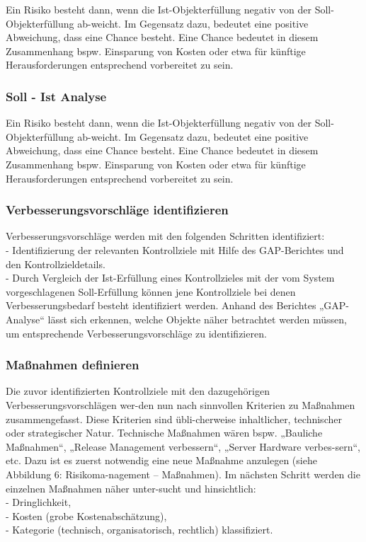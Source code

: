 Ein Risiko besteht dann, wenn die Ist-Objekterfüllung negativ von der Soll-Objekterfüllung ab-weicht. Im Gegensatz dazu, bedeutet eine positive Abweichung, dass eine Chance besteht. Eine Chance bedeutet in diesem Zusammenhang bspw. Einsparung von Kosten oder etwa für künftige Herausforderungen entsprechend vorbereitet zu sein.
\subsubsection{Soll - Ist Analyse}
Ein Risiko besteht dann, wenn die Ist-Objekterfüllung negativ von der Soll-Objekterfüllung ab-weicht. Im Gegensatz dazu, bedeutet eine positive Abweichung, dass eine Chance besteht. Eine Chance bedeutet in diesem Zusammenhang bspw. Einsparung von Kosten oder etwa für künftige Herausforderungen entsprechend vorbereitet zu sein.

\subsubsection{Verbesserungsvorschläge identifizieren}
Verbesserungsvorschläge werden mit den folgenden Schritten identifiziert:\\
- Identifizierung der relevanten Kontrollziele mit Hilfe des GAP-Berichtes und den Kontrollzieldetails.
\\- Durch Vergleich der Ist-Erfüllung eines Kontrollzieles mit der vom System vorgeschlagenen Soll-Erfüllung können jene Kontrollziele bei denen Verbesserungsbedarf besteht identifiziert werden.
Anhand des Berichtes „GAP-Analyse“ lässt sich erkennen, welche Objekte näher betrachtet werden müssen, um entsprechende Verbesserungsvorschläge zu identifizieren.
\subsubsection{Maßnahmen definieren}
Die zuvor identifizierten Kontrollziele mit den dazugehörigen Verbesserungsvorschlägen wer-den nun nach sinnvollen Kriterien zu Maßnahmen zusammengefasst. Diese Kriterien sind übli-cherweise inhaltlicher, technischer oder strategischer Natur. Technische Maßnahmen wären bspw. „Bauliche Maßnahmen“, „Release Management verbessern“, „Server Hardware verbes-sern“, etc.
Dazu ist es zuerst notwendig eine neue Maßnahme anzulegen (siehe Abbildung 6: Risikoma-nagement – Maßnahmen). Im nächsten Schritt werden die einzelnen Maßnahmen näher unter-sucht und hinsichtlich:\\
- Dringlichkeit,\\
- Kosten (grobe Kostenabschätzung),\\
- Kategorie (technisch, organisatorisch, rechtlich)
klassifiziert.
